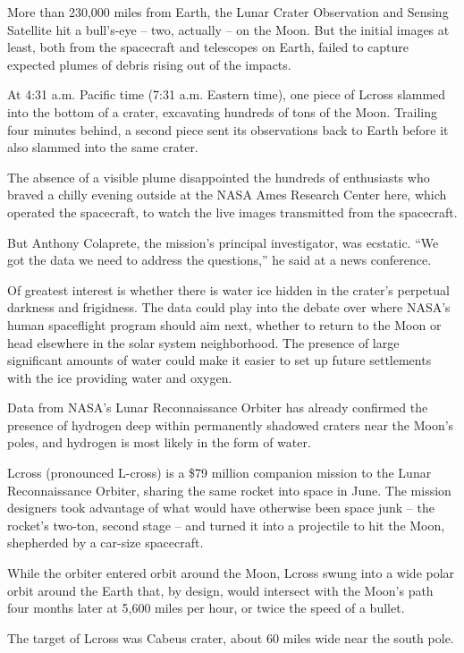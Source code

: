 ﻿\documentclass[12pt]{article}
\begin{document}
More than 230,000 miles from Earth, the Lunar Crater Observation and Sensing Satellite hit a
bull's-eye -- two, actually -- on the Moon. But the initial images at least, both from the
spacecraft and telescopes on Earth, failed to capture expected plumes of debris rising out of the
impacts.

At 4:31 a.m. Pacific time (7:31 a.m. Eastern time), one piece of Lcross slammed into the bottom of a
crater, excavating hundreds of tons of the Moon. Trailing four minutes behind, a second piece sent
its observations back to Earth before it also slammed into the same crater.

The absence of a visible plume disappointed the hundreds of enthusiasts who braved a chilly evening
outside at the NASA Ames Research Center here, which operated the spacecraft, to watch the live
images transmitted from the spacecraft.

But Anthony Colaprete, the mission's principal investigator, was ecstatic. ``We got the data we need
to address the questions,'' he said at a news conference.

Of greatest interest is whether there is water ice hidden in the crater's perpetual darkness and
frigidness. The data could play into the debate over where NASA's human spaceflight program should
aim next, whether to return to the Moon or head elsewhere in the solar system neighborhood. The
presence of large significant amounts of water could make it easier to set up future settlements
with the ice providing water and oxygen.

Data from NASA's Lunar Reconnaissance Orbiter has already confirmed the presence of hydrogen deep
within permanently shadowed craters near the Moon's poles, and hydrogen is most likely in the form
of water.

Lcross (pronounced L-cross) is a \$79 million companion mission to the Lunar Reconnaissance Orbiter,
sharing the same rocket into space in June. The mission designers took advantage of what would have
otherwise been space junk -- the rocket's two-ton, second stage -- and turned it into a projectile
to hit the Moon, shepherded by a car-size spacecraft.

While the orbiter entered orbit around the Moon, Lcross swung into a wide polar orbit around the
Earth that, by design, would intersect with the Moon's path four months later at 5,600 miles per
hour, or twice the speed of a bullet.

The target of Lcross was Cabeus crater, about 60 miles wide near the south pole.
\end{document}
